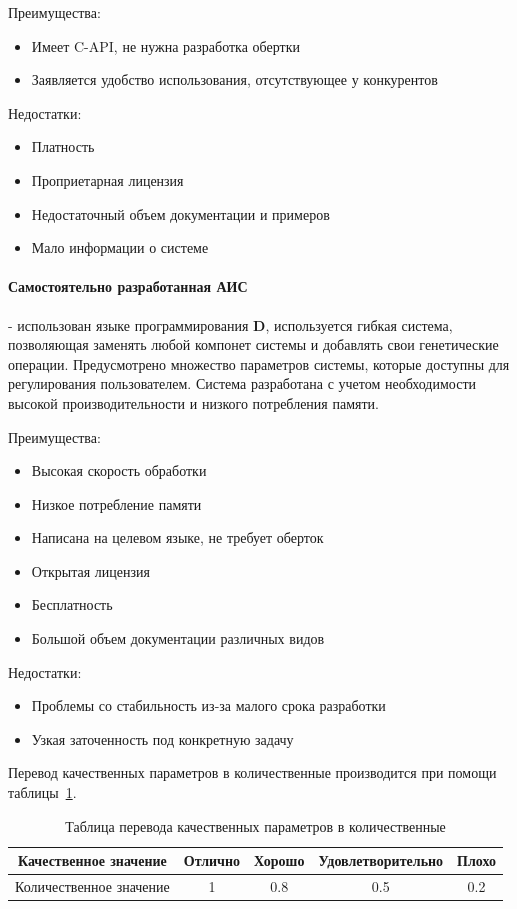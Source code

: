 \documentclass[russian,utf8,emptystyle]{eskdtext}
\begin{document}
Преимущества:
\begin{itemize}
\item Имеет C-API, не нужна разработка обертки
\item Заявляется удобство использования, отсутствующее у конкурентов
\end{itemize}

Недостатки:
\begin{itemize}
\item Платность
\item Проприетарная лицензия
\item Недостаточный объем документации и примеров
\item Мало информации о системе
\end{itemize}

\paragraph{Самостоятельно разработанная АИС} - использован языке программирования \textbf{D}, используется гибкая система, позволяющая заменять любой компонет системы и добавлять свои генетические операции. Предусмотрено множество параметров системы, которые доступны для регулирования пользователем. Система разработана с учетом необходимости высокой производительности и низкого потребления памяти.

Преимущества:
\begin{itemize}
\item Высокая скорость обработки
\item Низкое потребление памяти
\item Написана на целевом языке, не требует оберток
\item Открытая лицензия
\item Бесплатность
\item Большой объем документации различных видов
\end{itemize}

Недостатки:
\begin{itemize}
\item Проблемы со стабильность из-за малого срока разработки
\item Узкая заточенность под конкретную задачу
\end{itemize}

Перевод качественных параметров в количественные производится при помощи таблицы~\ref{tab:quality_to_value}.
\begin{table}
\centering
\caption{Таблица перевода качественных параметров в количественные}
\label{tab:quality_to_value}
\begin{tabular}{|c|c|c|c|c|}
\hline 
Качественное значение & Отлично & Хорошо & Удовлетворительно & Плохо \\ 
\hline 
Количественное значение & 1 & 0.8 & 0.5 & 0.2 \\ 
\hline 
\end{tabular} 
\end{table}
\end{document}
